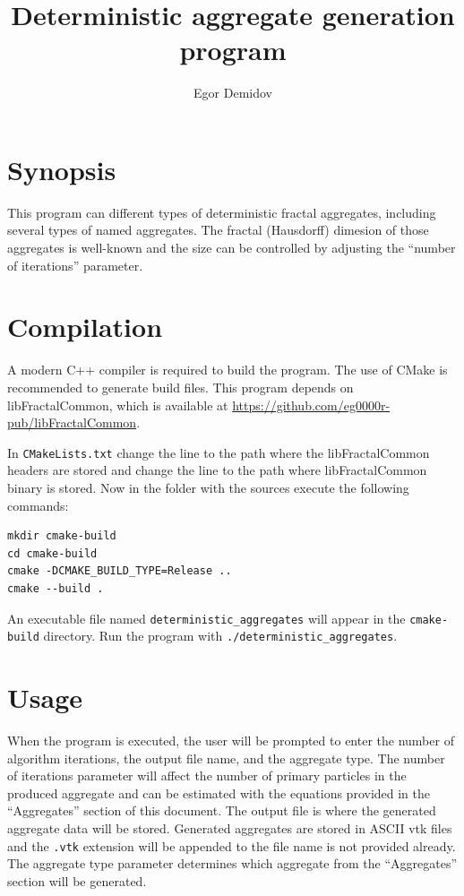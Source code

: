 \documentclass{article}
\title{Deterministic aggregate generation program}
\author{Egor Demidov}
\begin{document}
\maketitle

\section*{Synopsis}

This program can different types of deterministic fractal aggregates, including several types of named aggregates. The fractal (Hausdorff) dimesion of those aggregates is well-known and the size can be controlled by adjusting the ``number of iterations'' parameter.

\section*{Compilation}

A modern C++ compiler is required to build the program. The use of CMake is recommended to generate build files. This program depends on libFractalCommon, which is available at \href{https://github.com/eg0000r-pub/libFractalCommon}{https://github.com/eg0000r-pub/libFractalCommon}.

In \texttt{CMakeLists.txt} change the line  to the path where the libFractalCommon headers are stored and change the line  to the path where libFractalCommon binary is stored. Now in the folder with the sources execute the following commands:

\begin{verbatim}
mkdir cmake-build
cd cmake-build
cmake -DCMAKE_BUILD_TYPE=Release ..
cmake --build .
\end{verbatim}

An executable file named \texttt{deterministic\_aggregates} will appear in the \texttt{cmake-build} directory. Run the program with \texttt{./deterministic\_aggregates}.

\section*{Usage}

When the program is executed, the user will be prompted to enter the number of algorithm iterations, the output file name, and the aggregate type. The number of iterations parameter will affect the number of primary particles in the produced aggregate and can be estimated with the equations provided in the ``Aggregates'' section of this document. The output file is where the generated aggregate data will be stored. Generated aggregates are stored in ASCII vtk files and the \texttt{.vtk} extension will be appended to the file name is not provided already. The aggregate type parameter determines which aggregate from the ``Aggregates'' section will be generated.
\end{document}
